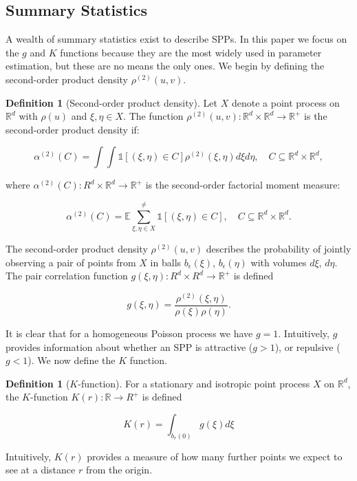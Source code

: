 \documentclass[letterpaper]{article}
\newcommand{\R}{\mathbb{R}}
\newcommand{\E}{\mathbb{E}}
\newcommand{\1}{\mathds{1}}
\newcommand{\xeta}{\xi, \eta}
\theoremstyle{plain}
\theoremstyle{definition}
\newtheorem{definition}[theorem]{Definition}
\theoremstyle{remark}
\begin{document}
\subsection{Summary Statistics}
A wealth of summary statistics exist to describe SPPs. In this paper we focus on the $g$ and $K$ functions because they are the most widely used in parameter estimation, but these are no means the only ones. We begin by defining the second-order product density $\rho^{(2)}(u, v)$.

    \begin{definition}[Second-order product density]
        Let $X$ denote a point process on $\R^d$ with $\rho(u)$ and $\xeta \in X$. The function $\rho^{(2)}(u, v):  \R^d \times \R^d \rightarrow \R^+$ is the second-order product density if:

            \[
            \alpha^{(2)}(C) = \int \int \1[(\xeta) \in C]\rho^{(2)}(\xeta) d\xi d\eta, \quad C \subseteq \R^d \times \R^d,
            \]

        where $\alpha^{(2)}(C): R^d \times \R^d \rightarrow \R^+$ is the second-order factorial moment measure:

            \[
            \alpha^{(2)}(C) = \E\sum_{\xeta \in X}^{\neq} \1[(\xeta) \in C], \quad C \subseteq \R^d \times \R^d.
            \]
    \end{definition}

The second-order product density $\rho^{(2)}(u, v)$ describes the probability of jointly observing a pair of points from $X$ in balls $b_{\epsilon}(\xi)$, $b_{\epsilon}(\eta)$ with volumes $d\xi$, $d\eta$. The pair correlation function $g(\xeta): R^d \times R^d \rightarrow \R^+$ is defined

    \[
    g(\xeta) = \frac{\rho^{(2)}(\xeta)}{\rho(\xi)\rho(\eta)}.
    \]

It is clear that for a homogeneous Poisson process we have $g = 1$. Intuitively, $g$ provides information about whether an SPP is attractive ($g > 1$), or repulsive ($g < 1$). We now define the $K$ function.

    \begin{definition}[$K$-function]
        For a stationary and isotropic point process $X$ on $\R^d$, the $K$-function $K(r): \R \rightarrow R^+$ is defined

            \[
            K(r) = \int_{b_r(0)} g(\xi) d\xi
            \]
    \end{definition}

Intuitively, $K(r)$ provides a measure of how many further points we expect to see at a distance $r$ from the origin.
\end{document}
